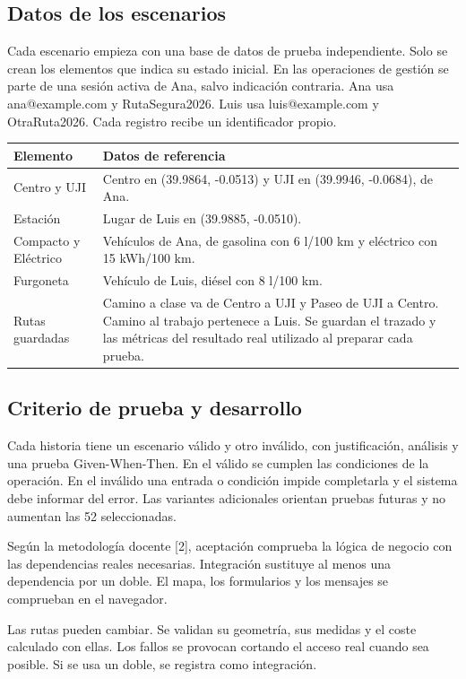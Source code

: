 \subsection*{Datos de los escenarios}
Cada escenario empieza con una base de datos de prueba independiente. Solo se crean los elementos que indica su estado inicial. En las operaciones de gestión se parte de una sesión activa de Ana, salvo indicación contraria. Ana usa ana@example.com y RutaSegura2026. Luis usa luis@example.com y OtraRuta2026. Cada registro recibe un identificador propio.\par
\begingroup\fontsize{9.5}{12}\selectfont
\begin{tabularx}{\linewidth}{@{}p{3.4cm}Y@{}}\toprule
\textbf{Elemento}&\textbf{Datos de referencia}\\\midrule
Centro y UJI&Centro en (39.9864, -0.0513) y UJI en (39.9946, -0.0684), de Ana.\\[2pt]
Estación&Lugar de Luis en (39.9885, -0.0510).\\[2pt]
Compacto y Eléctrico&Vehículos de Ana, de gasolina con 6 l/100 km y eléctrico con 15 kWh/100 km.\\[2pt]
Furgoneta&Vehículo de Luis, diésel con 8 l/100 km.\\[2pt]
Rutas guardadas&Camino a clase va de Centro a UJI y Paseo de UJI a Centro. Camino al trabajo pertenece a Luis. Se guardan el trazado y las métricas del resultado real utilizado al preparar cada prueba.\\\bottomrule
\end{tabularx}\endgroup\par
\subsection*{Criterio de prueba y desarrollo}
Cada historia tiene un escenario válido y otro inválido, con justificación, análisis y una prueba Given-When-Then. En el válido se cumplen las condiciones de la operación. En el inválido una entrada o condición impide completarla y el sistema debe informar del error. Las variantes adicionales orientan pruebas futuras y no aumentan las 52 seleccionadas.\par
Según la metodología docente [2], aceptación comprueba la lógica de negocio con las dependencias reales necesarias. Integración sustituye al menos una dependencia por un doble. El mapa, los formularios y los mensajes se comprueban en el navegador.\par
Las rutas pueden cambiar. Se validan su geometría, sus medidas y el coste calculado con ellas. Los fallos se provocan cortando el acceso real cuando sea posible. Si se usa un doble, se registra como integración.\par
